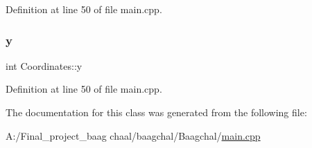 Definition at line 50 of file main.\+cpp.

\mbox{\label{class_coordinates_aae83211da8e94ae2edd3b407c19bff07}} 
\subsubsection{\texorpdfstring{y}{y}}
{\footnotesize\ttfamily int Coordinates\+::y}



Definition at line 50 of file main.\+cpp.



The documentation for this class was generated from the following file\+:\begin{DoxyCompactItemize}
\item 
A\+:/\+Final\+\_\+project\+\_\+baag chaal/baagchal/\+Baagchal/\mbox{\hyperlink{main_8cpp}{main.\+cpp}}\end{DoxyCompactItemize}
